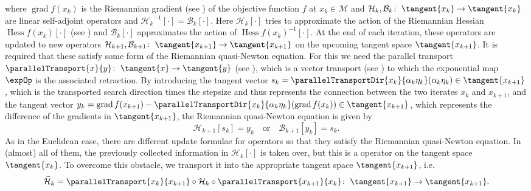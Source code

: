where $\operatorname{grad} f(x_k)$ is the Riemannian gradient (see \cite[p.~46]{AbsilMahonySepulchre:2008}) of the objective function $f$ at $x_k \in \mathcal{M}$ and $\mathcal{H}_k, \mathcal{B}_k \colon \; \tangent{x_k} \to \tangent{x_k}$ are linear self-adjoint operators and ${\mathcal{H}_k}^{-1} [\cdot] = \mathcal{B}_k [\cdot]$. Here $\mathcal{H}_k [\cdot]$ tries to approximate the action of the Riemannian Hessian $\operatorname{Hess} f(x_k) [\cdot]$ (see \cite[Definition~5.5.1]{AbsilMahonySepulchre:2008}) and $\mathcal{B}_k [\cdot]$ approximates the action of ${\operatorname{Hess} f(x_k)}^{-1} [\cdot]$. At the end of each iteration, these operators are updated to new operators $\mathcal{H}_{k+1}, \mathcal{B}_{k+1} \colon \; \tangent{x_{k+1}} \to \tangent{x_{k+1}}$ on the upcoming tangent space $\tangent{x_{k+1}}$. It is required that these satisfy some form of the Riemannian quasi-Newton equation. For this we need the parallel transport $\parallelTransport{x}{y} \colon \; \tangent{x} \to \tangent{y}$ (see \cite[p.~169-170]{AbsilMahonySepulchre:2008}), which is a vector transport (see \cite[Definition~8.1.1]{AbsilMahonySepulchre:2008}) to which the exponential map $\expOp$ is the associated retraction. By introducing the tangent vector $s_k = \parallelTransportDir{x_k}{\alpha_k \eta_k}(\alpha_k \eta_k) \in \tangent{x_{k+1}}$, which is the transported search direction times the stepsize and thus represents the connection between the two iterates $x_k$ and $x_{k+1}$, and the tangent vector $y_k = \operatorname{grad} f(x_{k+1}) - \parallelTransportDir{x_k}{\alpha_k \eta_k}(\operatorname{grad} f(x_k)) \in \tangent{x_{k+1}}$, which represents the difference of the gradients in $\tangent{x_{k+1}}$, the Riemannian quasi-Newton equation is given by 
\begin{equation*}
    \mathcal{H}_{k+1} [s_k] = y_k \quad \text{or} \quad \mathcal{B}_{k+1} [y_k] = s_k.
\end{equation*}
As in the Euclidean case, there are different update formulae for operators so that they satisfy the Riemannian quasi-Newton equation. In (almost) all of them, the previously collected information in $\mathcal{H}_k [\cdot]$
is taken over, but this is a operator on the tangent space $\tangent{x_k}$. To overcome this obstacle, we transport it into the appropriate tangent space $\tangent{x_{k+1}}$, i.e.
\begin{equation*}
    \widetilde{\mathcal{H}}_k = \parallelTransport{x_k}{x_{k+1}} \circ \mathcal{H}_k \circ \parallelTransport{x_{k+1}}{x_k} \colon \; \tangent{x_{k+1}} \to \tangent{x_{k+1}}.
\end{equation*}
